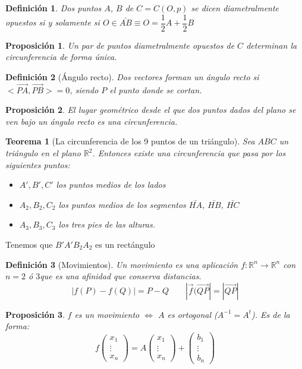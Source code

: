 \documentclass[11pt, a4paper, titlepage]{article}
\makeatletter
\renewenvironment{proof}[1][\proofname] {\vspace{-15pt}\par\pushQED{\qed}\normalfont\topsep6\p@\@plus6\p@\relax\trivlist\item[\hskip\labelsep\it#1\@addpunct{.}]\ignorespaces}{\popQED\endtrivlist\@endpefalse}
\newcommand{\R}{\mathbb{R}}
\theoremstyle{theorem-style}
\newtheorem*{nth}{Teorema}
\newtheorem*{nprop}{Proposición}
\theoremstyle{definition-style}
\newtheorem*{ndef}{Definición}
\theoremstyle{remark-style}
\theoremstyle{example-style}
\makeatother
\begin{document}


\begin{ndef}
	Dos puntos $A$, $B$ de $C = C(O,p) $ se dicen diametralmente opuestos si y solamente si $O \in \bar{AB} \equiv O = \dfrac{1}{2}A + \dfrac{1}{2}B$
\end{ndef}


\begin{nprop}
	Un par de puntos diametralmente opuestos de $C$ determinan la circunferencia de forma única.
\end{nprop}

\begin{ndef}[Ángulo recto]
	Dos vectores forman un ángulo recto si $<\vec{PA},\vec{PB}> = 0$, siendo $P$ el punto donde se cortan.
\end{ndef}

\begin{nprop}
	El lugar geométrico desde el que dos puntos dados del plano se ven bajo un ángulo recto es una circunferencia.
\end{nprop}

\begin{nth}[La circunferencia de los 9 puntos de un triángulo]
	Sea $ABC$ un triángulo en el plano $\R^2$. Entonces existe una circunferencia que pasa por los siguientes puntos:
	\begin{itemize}
	\item $A',B',C'$ los puntos medios de los lados
	\item $A_2,B_2,C_2$ los puntos medios de los segmentos $\bar{HA}$, $\bar{HB}$, $\bar{HC}$
	\item $A_3,B_3,C_3$ los tres pies de las alturas.
\end{itemize}
\end{nth}
\begin{proof}
	Tenemos que $B'A'B_2A_2$ es un rectángulo
\end{proof}



\begin{ndef}[Movimientos]
	Un movimiento es una aplicación $f:\R^n \to \R^n$ con $n= 2$ ó $3$que es una afinidad que conserva distancias.
	\[
	|f(P)-f(Q)|= P-Q \quad  \quad |\vec{f}(\vec{QP}|= |\vec{QP}|
	\]
\end{ndef}

\begin{nprop}
	$f$ es un movimiento $\iff$ $A$ es ortogonal ($A^{-1}= A^t$). Es de la forma:
	\[
	f \begin{pmatrix}
x_1\\
\vdots\\
x_n 
\end{pmatrix} = A \begin{pmatrix}
x_1\\
\vdots\\
x_n 
\end{pmatrix} + \begin{pmatrix}
b_1\\
\vdots\\
b_n 
\end{pmatrix}
	\]
\end{nprop}
\end{document}
